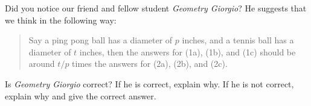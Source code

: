 \documentclass[handout,noauthor,nooutcomes,hints]{ximera}
\begin{document}
\mynewpage

\begin{question}
Did you notice our friend and fellow student \textit{Geometry Giorgio}? He
suggests that we think in the following way:
\begin{quote}
  Say a ping pong ball has a diameter of $p$ inches, and a
tennis ball has a diameter of $t$ inches, then the answers for
(1a), (1b), and (1c) should be around $t/p$ times the answers for
(2a), (2b), and (2c).
\end{quote}
Is \textit{Geometry Giorgio} correct?  If he is
correct, explain why. If he is not correct, explain why and give the
correct answer.
\end{question}
\end{document}
